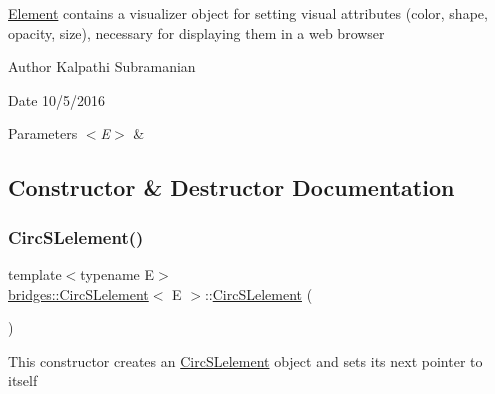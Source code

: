\mbox{\hyperlink{classbridges_1_1_element}{Element}} contains a visualizer object for setting visual attributes (color, shape, opacity, size), necessary for displaying them in a web browser

\begin{DoxyAuthor}{Author}
Kalpathi Subramanian 
\end{DoxyAuthor}
\begin{DoxyDate}{Date}
10/5/2016
\end{DoxyDate}

\begin{DoxyParams}{Parameters}
{\em $<$\+E$>$} & \\
\hline
\end{DoxyParams}


\subsection{Constructor \& Destructor Documentation}
\mbox{\label{classbridges_1_1_circ_s_lelement_a86183d3487b906550d8f32bda3a68f98}} 
\subsubsection{\texorpdfstring{Circ\+S\+Lelement()}{CircSLelement()}\hspace{0.1cm}{\footnotesize\ttfamily [1/8]}}
{\footnotesize\ttfamily template$<$typename E$>$ \\
\mbox{\hyperlink{classbridges_1_1_circ_s_lelement}{bridges\+::\+Circ\+S\+Lelement}}$<$ E $>$\+::\mbox{\hyperlink{classbridges_1_1_circ_s_lelement}{Circ\+S\+Lelement}} (\begin{DoxyParamCaption}{ }\end{DoxyParamCaption})\hspace{0.3cm}{\ttfamily [inline]}}

This constructor creates an \mbox{\hyperlink{classbridges_1_1_circ_s_lelement}{Circ\+S\+Lelement}} object and sets its next pointer to itself \mbox{\label{classbridges_1_1_circ_s_lelement_a765032df6cfaa7cf7589c9e0df29bae4}} 
